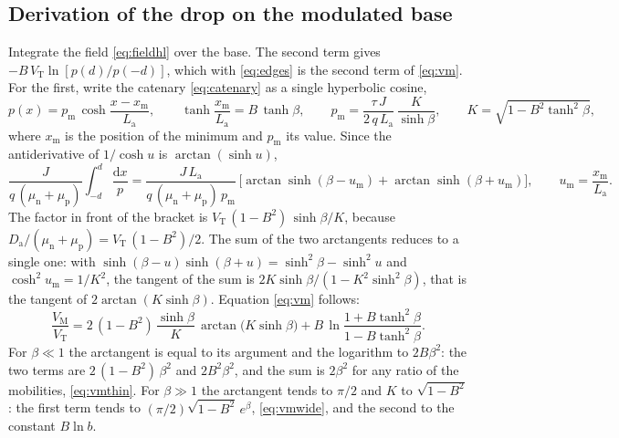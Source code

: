 \documentclass[10pt,a4paper]{scrartcl}
\newcommand{\VT}{V_\mathrm{T}}
\newcommand{\diff}{\mathrm{d}}
\newcommand{\Da}{D_\mathrm{a}}
\newcommand{\La}{L_\mathrm{a}}
\newcommand{\mun}{\mu_\mathrm{n}}
\newcommand{\mup}{\mu_\mathrm{p}}
\newcommand{\VM}{V_\mathrm{M}}
\begin{document}
\subsection{Derivation of the drop on the modulated base}
\label{app:vm}
Integrate the field \eqref{eq:fieldhl} over the base. The second term gives $-B\,\VT\ln[p(d)/p(-d)]$, which with \eqref{eq:edges} is the second term of \eqref{eq:vm}. For the first, write the catenary \eqref{eq:catenary} as a single hyperbolic cosine,
\begin{equation}
p(x) = p_\mathrm{m}\,\cosh\frac{x - x_\mathrm{m}}{\La} , \qquad \tanh\frac{x_\mathrm{m}}{\La} = B\,\tanh\beta , \qquad
p_\mathrm{m} = \frac{\tau\,J}{2\,q\,\La}\,\frac{K}{\sinh\beta} , \qquad K = \sqrt{1 - B^2\tanh^2\beta} ,
\end{equation}
where $x_\mathrm{m}$ is the position of the minimum and $p_\mathrm{m}$ its value. Since the antiderivative of $1/\cosh u$ is $\arctan(\sinh u)$,
\begin{equation}
\frac{J}{q\,(\mun+\mup)}\int_{-d}^{d}\frac{\diff x}{p}
= \frac{J\,\La}{q\,(\mun+\mup)\,p_\mathrm{m}}\,\bigl[\arctan\sinh(\beta - u_\mathrm{m}) + \arctan\sinh(\beta + u_\mathrm{m})\bigr] , \qquad u_\mathrm{m} = \frac{x_\mathrm{m}}{\La} .
\end{equation}
The factor in front of the bracket is $\VT\,(1-B^2)\,\sinh\beta/K$, because $\Da/(\mun+\mup) = \VT\,(1-B^2)/2$. The sum of the two arctangents reduces to a single one: with $\sinh(\beta-u)\sinh(\beta+u) = \sinh^2\beta - \sinh^2 u$ and $\cosh^2 u_\mathrm{m} = 1/K^2$, the tangent of the sum is $2K\sinh\beta/(1 - K^2\sinh^2\beta)$, that is the tangent of $2\arctan(K\sinh\beta)$. Equation \eqref{eq:vm} follows:
\begin{equation}
\frac{\VM}{\VT} = 2\,(1-B^2)\,\frac{\sinh\beta}{K}\,\arctan\bigl(K\sinh\beta\bigr) + B\,\ln\frac{1 + B\tanh^2\beta}{1 - B\tanh^2\beta} .
\end{equation}
For $\beta \ll 1$ the arctangent is equal to its argument and the logarithm to $2B\beta^2$: the two terms are $2\,(1-B^2)\,\beta^2$ and $2B^2\beta^2$, and the sum is $2\beta^2$ for any ratio of the mobilities, \eqref{eq:vmthin}. For $\beta \gg 1$ the arctangent tends to $\pi/2$ and $K$ to $\sqrt{1-B^2}$: the first term tends to $(\pi/2)\sqrt{1-B^2}\,e^{\beta}$, \eqref{eq:vmwide}, and the second to the constant $B\ln b$.
\end{document}

